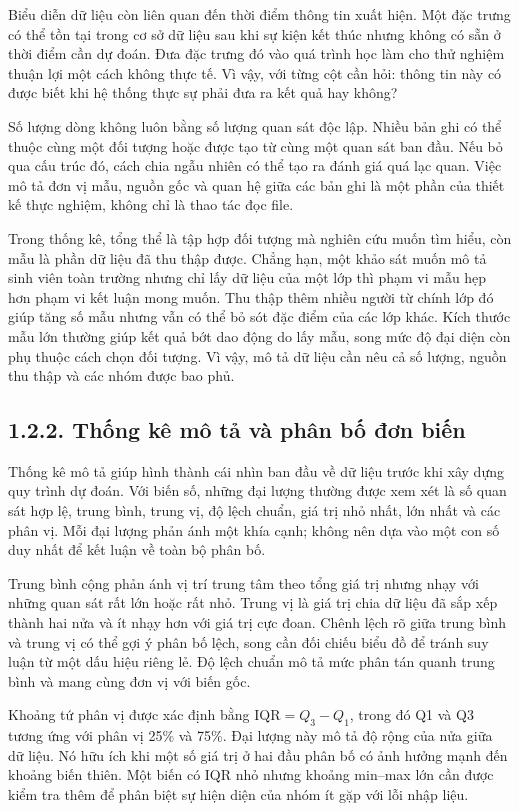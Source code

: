 Biểu diễn dữ liệu còn liên quan đến thời điểm thông tin xuất hiện. Một đặc trưng có thể tồn tại trong cơ sở dữ liệu sau khi sự kiện kết thúc nhưng không có sẵn ở thời điểm cần dự đoán. Đưa đặc trưng đó vào quá trình học làm cho thử nghiệm thuận lợi một cách không thực tế. Vì vậy, với từng cột cần hỏi: thông tin này có được biết khi hệ thống thực sự phải đưa ra kết quả hay không?


Số lượng dòng không luôn bằng số lượng quan sát độc lập. Nhiều bản ghi có thể thuộc cùng một đối tượng hoặc được tạo từ cùng một quan sát ban đầu. Nếu bỏ qua cấu trúc đó, cách chia ngẫu nhiên có thể tạo ra đánh giá quá lạc quan. Việc mô tả đơn vị mẫu, nguồn gốc và quan hệ giữa các bản ghi là một phần của thiết kế thực nghiệm, không chỉ là thao tác đọc file.


Trong thống kê, tổng thể là tập hợp đối tượng mà nghiên cứu muốn tìm hiểu, còn mẫu là phần dữ liệu đã thu thập được. Chẳng hạn, một khảo sát muốn mô tả sinh viên toàn trường nhưng chỉ lấy dữ liệu của một lớp thì phạm vi mẫu hẹp hơn phạm vi kết luận mong muốn. Thu thập thêm nhiều người từ chính lớp đó giúp tăng số mẫu nhưng vẫn có thể bỏ sót đặc điểm của các lớp khác. Kích thước mẫu lớn thường giúp kết quả bớt dao động do lấy mẫu, song mức độ đại diện còn phụ thuộc cách chọn đối tượng. Vì vậy, mô tả dữ liệu cần nêu cả số lượng, nguồn thu thập và các nhóm được bao phủ.


\subsection{1.2.2. Thống kê mô tả và phân bố đơn biến}

Thống kê mô tả giúp hình thành cái nhìn ban đầu về dữ liệu trước khi xây dựng quy trình dự đoán. Với biến số, những đại lượng thường được xem xét là số quan sát hợp lệ, trung bình, trung vị, độ lệch chuẩn, giá trị nhỏ nhất, lớn nhất và các phân vị. Mỗi đại lượng phản ánh một khía cạnh; không nên dựa vào một con số duy nhất để kết luận về toàn bộ phân bố.


Trung bình cộng phản ánh vị trí trung tâm theo tổng giá trị nhưng nhạy với những quan sát rất lớn hoặc rất nhỏ. Trung vị là giá trị chia dữ liệu đã sắp xếp thành hai nửa và ít nhạy hơn với giá trị cực đoan. Chênh lệch rõ giữa trung bình và trung vị có thể gợi ý phân bố lệch, song cần đối chiếu biểu đồ để tránh suy luận từ một dấu hiệu riêng lẻ. Độ lệch chuẩn mô tả mức phân tán quanh trung bình và mang cùng đơn vị với biến gốc.


Khoảng tứ phân vị được xác định bằng \(\mathrm{IQR}=Q_3-Q_1\), trong đó Q1 và Q3 tương ứng với phân vị 25\% và 75\%. Đại lượng này mô tả độ rộng của nửa giữa dữ liệu. Nó hữu ích khi một số giá trị ở hai đầu phân bố có ảnh hưởng mạnh đến khoảng biến thiên. Một biến có IQR nhỏ nhưng khoảng min–max lớn cần được kiểm tra thêm để phân biệt sự hiện diện của nhóm ít gặp với lỗi nhập liệu.


